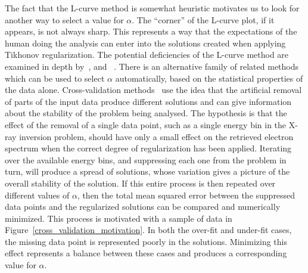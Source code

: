 The fact that the L-curve method is somewhat heuristic motivates us to look for another way to select a value for $\alpha$. The ``corner'' of the L-curve plot, if it appears, is not always sharp. This represents a way that the expectations of the human doing the analysis can enter into the solutions created when applying Tikhonov regularization. The potential deficiencies of the L-curve method are examined in depth by~\citet{Hanke1996,Hansen1993}, and ~\citet{Vogel1996}. There is an alternative family of related methods which can be used to select $\alpha$ automatically, based on the statistical properties of the data alone. Cross-validation methods~\citep{Golub1979} use the idea that the artificial removal of parts of the input data produce different solutions and can give information about the stability of the problem being analysed. The hypothesis is that the effect of the removal of a single data point, such as a single energy bin in the X-ray inversion problem, should have only a small effect on the retrieved electron spectrum when the correct degree of regularization has been applied. Iterating over the available energy bins, and suppressing each one from the problem in turn, will produce a spread of solutions, whose variation gives a picture of the overall stability of the solution. If this entire process is then repeated over different values of $\alpha$, then the total mean squared error between the suppressed data points and the regularized solutions can be compared and numerically minimized. This process is motivated with a sample of data in Figure~\ref{cross_validation_motivation}. In both the over-fit and under-fit cases, the missing data point is represented poorly in the solutions. Minimizing this effect represents a balance between these cases and produces a corresponding value for $\alpha$. 

